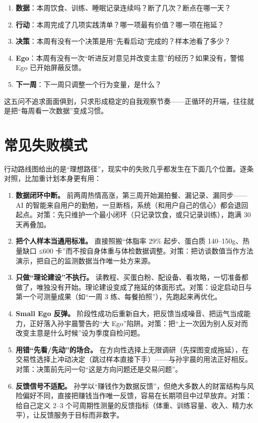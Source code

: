 \begin{enumerate}
\def\labelenumi{\arabic{enumi}.}
\tightlist
\item
  \textbf{数据}：本周饮食、训练、睡眠记录连续吗？断了几次？断点在哪一天？
\item
  \textbf{行动}：本周完成了几项实践清单？哪一项最有价值？哪一项在拖延？
\item
  \textbf{决策}：本周有没有一个决策是用``先看后动''完成的？样本池看了多少？
\item
  \textbf{Ego}：本周有没有一次``听进反对意见并改变主意''的经历？如果没有，警惕
  Ego 已开始屏蔽反馈。
\item
  \textbf{下一周}：下一周只调整一个行为变量，是什么？
\end{enumerate}

这五问不追求面面俱到，只求形成稳定的自我观察节奏------正循环的开端，往往就是把``每周看一次数据''变成习惯。

\section{常见失败模式}

行动路线图给出的是``理想路径''，现实中的失败几乎都发生在下面几个位置。逐条对照，比加重计划本身更有用：

\begin{enumerate}
\def\labelenumi{\arabic{enumi}.}
\tightlist
\item
  \textbf{数据闭环中断。}
  前两周热情高涨，第三周开始漏拍餐、漏记录、漏同步------AI
  的智能来自用户的勤勉，一旦断档，系统（和用户自己的信心）都会退回起点。对策：先只维护一个最小闭环（只记录饮食，或只记录训练），跑满
  30 天再叠加。
\item
  \textbf{把个人样本当通用标准。} 直接照搬``体脂率 29\% 起步、蛋白质
  140--150g、热量缺口 ≤600
  卡''而不按自身体重与体检数据调整。对策：把访谈数值当作方法演示，把自己的监测数据当作唯一处方来源。
\item
  \textbf{只做``理论建设''不执行。}
  读教程、买蛋白粉、配设备、看攻略，一切准备都做了，唯独没有开始。理论建设变成了拖延的体面形式。对策：设定启动日与第一个可测量成果（如``一周
  3 练、每餐拍照''），先跑起来再优化。
\item
  \textbf{Small Ego 反弹。}
  阶段性成功后重新自大，把反馈当成噪音、把运气当成能力，正好落入孙宇晨警告的``大
  Ego''陷阱。对策：把``上一次因为别人反对而改变主意是什么时候''设为季度自检问题。
\item
  \textbf{用错``先看/先动''的场合。}
  在方向性选择上无限调研（先探图变成拖延），在交易性选择上冲动决定（跳过样本直接下手）------与孙宇晨的用法正好相反。对策：决策前先问一句``这是方向问题还是交易问题''。
\item
  \textbf{反馈信号不适配。}
  孙学以``赚钱作为数据反馈''，但绝大多数人的财富结构与风险偏好不同，直接把赚钱当作唯一反馈，容易在长期项目中过早放弃。对策：给自己定义
  2--3
  个可周期性测量的反馈指标（体重、训练容量、收入、精力水平），让反馈服务于目标而非数字。
\end{enumerate}

